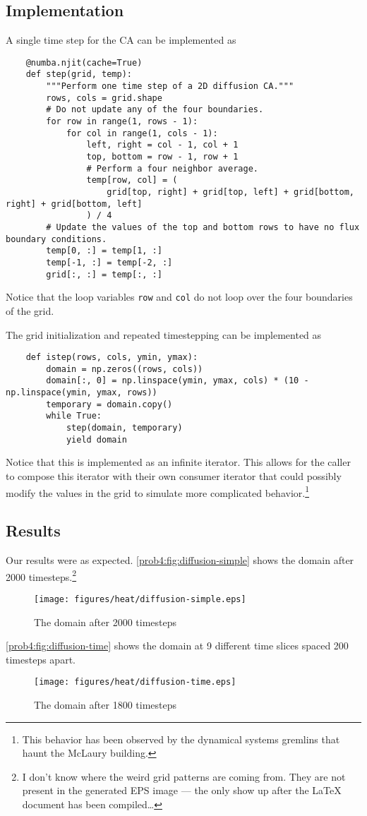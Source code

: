 \subsection{Implementation}
A single time step for the CA can be implemented as
\begin{verbatim}
    @numba.njit(cache=True)
    def step(grid, temp):
        """Perform one time step of a 2D diffusion CA."""
        rows, cols = grid.shape
        # Do not update any of the four boundaries.
        for row in range(1, rows - 1):
            for col in range(1, cols - 1):
                left, right = col - 1, col + 1
                top, bottom = row - 1, row + 1
                # Perform a four neighbor average.
                temp[row, col] = (
                    grid[top, right] + grid[top, left] + grid[bottom, right] + grid[bottom, left]
                ) / 4
        # Update the values of the top and bottom rows to have no flux boundary conditions.
        temp[0, :] = temp[1, :]
        temp[-1, :] = temp[-2, :]
        grid[:, :] = temp[:, :]
\end{verbatim}
Notice that the loop variables \texttt{row} and \texttt{col} do not loop over the four boundaries of the grid.

The grid initialization and repeated timestepping can be implemented as
\begin{verbatim}
    def istep(rows, cols, ymin, ymax):
        domain = np.zeros((rows, cols))
        domain[:, 0] = np.linspace(ymin, ymax, cols) * (10 - np.linspace(ymin, ymax, rows))
        temporary = domain.copy()
        while True:
            step(domain, temporary)
            yield domain
\end{verbatim}
Notice that this is implemented as an infinite iterator.
This allows for the caller to compose this iterator with their own consumer iterator that could possibly modify the values in the grid to simulate more complicated behavior.\footnote{This behavior has been observed by the dynamical systems gremlins that haunt the McLaury building.}

\subsection{Results}
Our results were as expected.
\autoref{prob4:fig:diffusion-simple} shows the domain after 2000 timesteps.\footnote{I don't know where the weird grid patterns are coming from. They are not present in the generated EPS image --- the only show up after the \LaTeX{} document has been compiled\dots}

\begin{figure}[H]
    \centering
    \texttt{[image: figures/heat/diffusion-simple.eps]}
    \caption{The domain after 2000 timesteps}\label{prob4:fig:diffusion-simple}
\end{figure}

\autoref{prob4:fig:diffusion-time} shows the domain at 9 different time slices spaced 200 timesteps apart.
\begin{figure}[H]
    \centering
    \texttt{[image: figures/heat/diffusion-time.eps]}
    \caption{The domain after 1800 timesteps}\label{prob4:fig:diffusion-time}
\end{figure}

